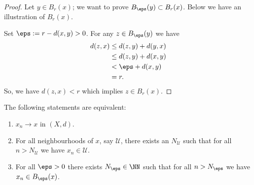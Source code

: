 \documentclass[12pt, a4paper]{article}
\begin{document}
\begin{proof}
    Let \(y \in B_{r}(x)\); we want to prove \(B_{\eps}(y) \subset B_r(x)\). Below we have an illustration of \(B_r(x)\).
    \begin{figure}[H]
        \centering
    \end{figure}
    Set \(\eps:= r-d(x,y)>0\). For any \(z \in B_{\eps}(y)\) we have 
    \[\begin{aligned}
        d(z,x) &\leq d(z,y)+d(y,x) \\
                &\leq d(z,y)+d(x,y) \\
                &<\eps+d(x,y) \\
                &= r.
    \end{aligned}\]
    So, we have \(d(z,x)<r\) which implies \(z \in B_r(x)\).
\end{proof}

\begin{mdlemma}
    The following statements are equivalent:
    \begin{enumerate}
        \item \(x_n \to x\) in \((X,d)\).
        \item For all neighbourhoods of \(x\), say \(\mathcal{U}\),  there exists an \(N_{\mathcal{U}}\) such that for all \(n>N_{\mathcal{U}}\) we have \(x_n \in \mathcal{U}\).
        \item For all \(\eps>0\) there exists \(N_{\eps}\in \NN\) such that for all \(n>N_{\eps}\) we have \(x_n \in B_{\eps}(x)\).
    \end{enumerate}
\end{mdlemma}
\end{document}
